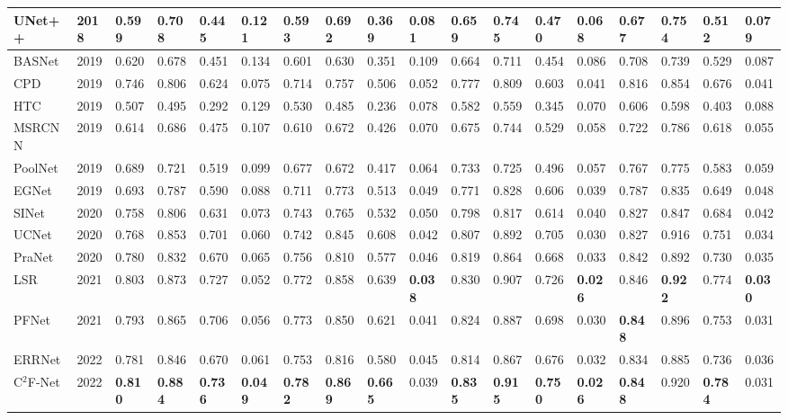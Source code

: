 \documentclass[lettersize,journal]{IEEEtran}
\newcommand{\ourM}{{C$^2$F-Net}}
\begin{document}
\begin{table*}[ht]
{\begin{tabular}{l|l|llll|llll|llll|llll}
			UNet++\cite{unetplus}&2018&0.599&0.708&0.445&0.121&
			0.593&0.692&0.369&0.081&
			0.659&0.745&0.470&0.068&
			0.677&0.754&0.512&0.079\\ \midrule
			BASNet\cite{basnet}&2019&0.620&0.678&0.451&0.134&
			0.601&0.630&0.351&0.109&
			0.664&0.711&0.454&0.086&
			0.708&0.739&0.529&0.087\\
			CPD\cite{cpd}&2019&0.746&0.806&0.624&0.075&
			0.714&0.757&0.506&0.052&
			0.777&0.809&0.603&0.041&
			0.816&0.854&0.676&0.041\\
			HTC\cite{htc}&2019&0.507&0.495&0.292&0.129&
			0.530&0.485&0.236&0.078&
			0.582&0.559&0.345&0.070&
			0.606&0.598&0.403&0.088\\
			MSRCNN\cite{masksrcnn}&2019&0.614&0.686&0.475&0.107&
			0.610&0.672&0.426&0.070&
			0.675&0.744&0.529&0.058&
			0.722&0.786&0.618&0.055\\
			PoolNet\cite{poolnet}&2019&0.689&0.721&0.519&0.099&
			0.677&0.672&0.417&0.064&
			0.733&0.725&0.496&0.057&
			0.767&0.775&0.583&0.059\\
			EGNet\cite{egnet}&2019&0.693&0.787&0.590&0.088&
			0.711&0.773&0.513&0.049&
			0.771&0.828&0.606&0.039&
			0.787&0.835&0.649&0.048\\ \midrule
			SINet\cite{sinet}&2020&0.758&0.806&0.631&0.073&
			0.743&0.765&0.532&0.050&
			0.798&0.817&0.614&0.040&
			0.827&0.847&0.684&0.042\\
			UCNet\cite{ucnet}&2020&0.768&0.853&0.701&0.060&
			0.742&0.845&0.608&0.042&
			0.807&0.892&0.705&0.030&
			0.827&0.916&0.751&0.034\\ \midrule
			PraNet\cite{pranet}&2020&0.780&0.832&0.670&0.065&
			0.756&0.810&0.577&0.046&
			0.819&0.864&0.668&0.033&
			0.842&0.892&0.730&0.035\\
			LSR\cite{lsr}&2021&0.803&0.873&0.727&0.052&
			0.772&0.858&0.639&\textbf{0.038}&
			0.830&0.907&0.726&\textbf{0.026}&
			0.846&\textbf{0.922}&0.774&\textbf{0.030}\\
			PFNet\cite{pfnet}&2021&0.793&0.865&0.706&0.056&
			0.773&0.850&0.621&0.041&
			0.824&0.887&0.698&0.030&
			\textbf{0.848}&0.896&0.753&0.031\\
			ERRNet\cite{errnet}&2022&0.781&0.846&0.670&0.061&
			0.753&0.816&0.580&0.045&
			0.814&0.867&0.676&0.032&
			0.834&0.885&0.736&0.036\\ \midrule
			\ourM&2022&\textbf{0.810}&\textbf{0.884}&\textbf{0.736}&\textbf{0.049}&
			\textbf{0.782}&\textbf{0.869}&\textbf{0.665}&0.039&
			\textbf{0.835}&\textbf{0.915}&\textbf{0.750}&\textbf{0.026}&
			\textbf{0.848}&0.920&\textbf{0.784}&0.031\\			
			\bottomrule			
		\end{tabular}
	}
	\label{tab2}
\end{table*}
\begin{figure*}[hb]
\end{figure*}
\end{document}
